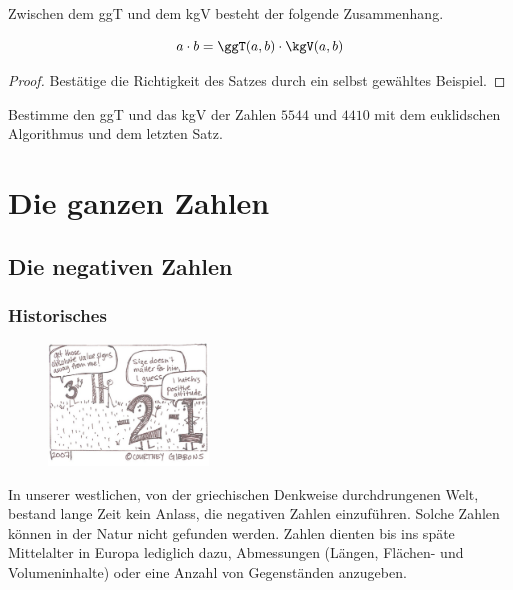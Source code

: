 \documentclass[%
11pt,%
twoside,%
titlepage,%
german,%
headsepline%
]{scrartcl}
\begin{document}
Zwischen dem ggT und dem kgV besteht der folgende Zusammenhang.

\begin{csatz}[Produktsatz]{}
$$a\cdot b=\ggT(a,b)\cdot\kgV(a,b)$$
\end{csatz}

\begin{proof}
Bestätige die Richtigkeit des Satzes durch ein selbst gewähltes Beispiel.
\end{proof}

\begin{ueb}
Bestimme den ggT und das kgV der Zahlen $5544$ und $4410$ mit dem euklidschen Algorithmus und dem letzten Satz.
\end{ueb}

\clearpage

\section{Die ganzen Zahlen}
\subsection{Die negativen Zahlen}

\subsubsection{Historisches}

\begin{figure}
\vspace{-22pt}
  \begin{center}
    \includegraphics[width=0.38\textwidth]{pictures/negative}
  \end{center}
\vspace{-22pt}
\end{figure}
In unserer westlichen, von der griechischen Denkweise durchdrungenen Welt, bestand lange Zeit kein Anlass, die negativen Zahlen einzuführen. Solche Zahlen können in der Natur nicht gefunden werden. Zahlen dienten bis ins späte Mittelalter in Europa lediglich dazu, Abmessungen (Längen, Flächen- und Volumeninhalte) oder eine Anzahl von Gegenständen anzugeben.
\end{document}
